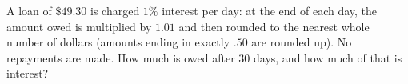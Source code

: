 A loan of $\$49.30$ is charged $1\%$ interest per day: at the end of each day, the amount owed is multiplied by $1.01$ and then rounded to the nearest whole number of dollars (amounts ending in exactly $.50$ are rounded up). No repayments are made. How much is owed after $30$ days, and how much of that is interest?
